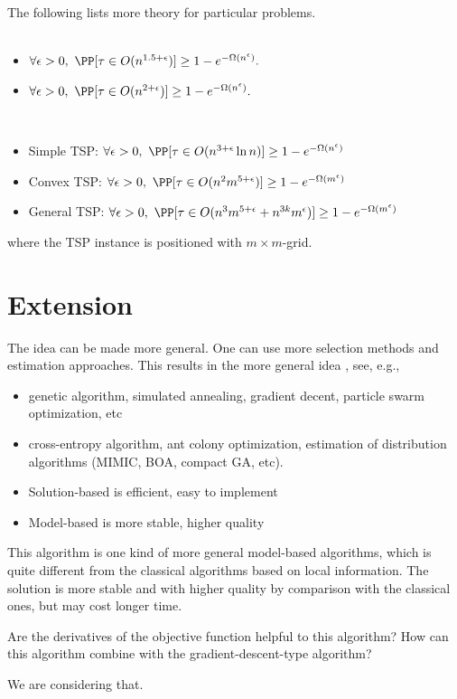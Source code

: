     		The following lists more theory for particular problems.\\[1ex]
    		\\[1ex]
    		\begin{itemize}
    			\item {} $\forall \epsilon>0,\ \PP[\tau \in O(n^{1.5+\epsilon})]\ge 1-e^{-\Omega(n^\epsilon)}.$
    			\item {} $\forall \epsilon>0,\ \PP[\tau \in O(n^{2+\epsilon})]\ge 1-e^{-\Omega(n^\epsilon)}.$
    		\end{itemize}
    		\\[1ex]
    		\begin{itemize}
    			\item Simple TSP: $\forall \epsilon>0,\ \PP[\tau \in O(n^{3+\epsilon}\ln n)]\ge 1-e^{-\Omega(n^{\epsilon})}$
    			\item Convex TSP: $\forall \epsilon>0,\ \PP [\tau \in O(n^2m^{5+\epsilon})] \ge 1-e^{-\Omega(m^\epsilon)}$
    			\item General TSP: $\forall \epsilon>0,\ \PP [\tau \in O(n^3m^{5+\epsilon}+n^{3k}m^{\epsilon})]\ge 1-e^{-\Omega(m^\epsilon)}$
    		\end{itemize}
    		where the TSP instance is positioned with $m\times m$-grid. 

    	\section[Extension]{Extension}
    		The idea can be made more general. One can use more selection
    		methods and estimation approaches. This results in the more general
    		idea , see, e.g., \\[1ex]
    		\begin{itemize}
    			\item {} genetic algorithm, simulated annealing, gradient decent, particle swarm optimization, etc
    			\item {} cross-entropy algorithm, ant colony optimization, estimation of distribution algorithms (MIMIC, BOA, compact GA, etc).
    			\item Solution-based is efficient, easy to implement
    			\item Model-based is more stable, higher quality
    		\end{itemize}
\begin{note}
      This algorithm is one kind of more general model-based algorithms,
      which is quite different from the classical algorithms based on local information.
      The solution is more stable and with higher quality by comparison with the classical ones,
      but may cost longer time.
\end{note}

\begin{ques}
      Are the derivatives of the objective function helpful to this algorithm? How can this algorithm 
      combine with the gradient-descent-type algorithm?
\end{ques}
\begin{answ}
      We are considering that.
\end{answ}

